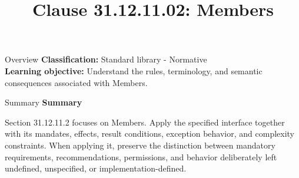 \documentclass[10pt,letterpaper]{article}
\title{Clause 31.12.11.02: Members}
\author{}
\date{}
\begin{document}
\maketitle
\begin{CornellOverviewBox}{Overview}
\textbf{Classification:} Standard library - Normative\\[2pt]
\textbf{Learning objective:} Understand the rules, terminology, and semantic consequences associated with Members.
\end{CornellOverviewBox}\begin{CornellSummaryBox}{Summary}
{\sffamily\bfseries\color{Accent} Summary}\par\vspace{3pt}Section 31.12.11.2 focuses on Members. Apply the specified interface together with its mandates, effects, result conditions, exception behavior, and complexity constraints. When applying it, preserve the distinction between mandatory requirements, recommendations, permissions, and behavior deliberately left undefined, unspecified, or implementation-defined.
\end{CornellSummaryBox}
\end{document}

